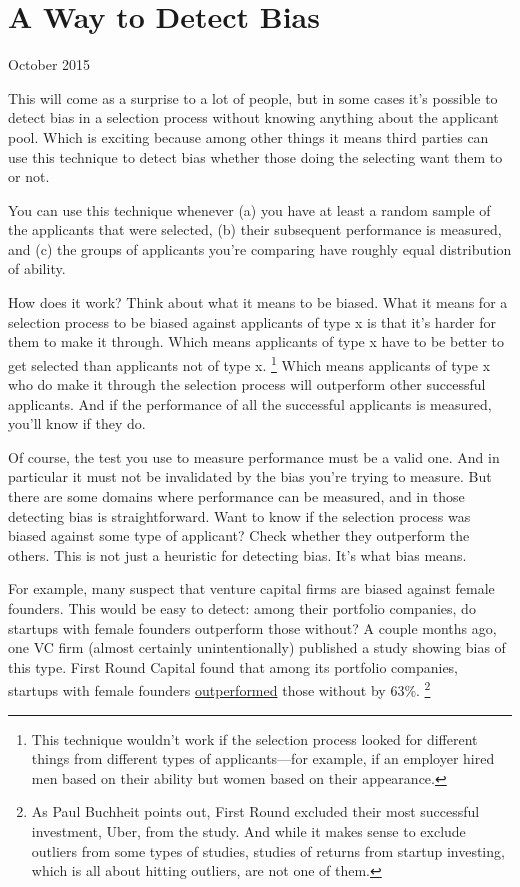 \chapter{A Way to Detect Bias}

October 2015

This will come as a surprise to a lot of people, but in some cases it's
possible to detect bias in a selection process without knowing anything
about the applicant pool. Which is exciting because among other things
it means third parties can use this technique to detect bias whether
those doing the selecting want them to or not.

You can use this technique whenever (a) you have at least a random
sample of the applicants that were selected, (b) their subsequent
performance is measured, and (c) the groups of applicants you're
comparing have roughly equal distribution of ability.

How does it work? Think about what it means to be biased. What it means
for a selection process to be biased against applicants of type x is
that it's harder for them to make it through. Which means applicants of
type x have to be better to get selected than applicants not of type x.
\footnote{This technique wouldn't work if the selection process looked for
different things from different types of applicants---for example, if an
employer hired men based on their ability but women based on their
appearance.} Which means applicants of type x who do make it
through the selection process will outperform other successful
applicants. And if the performance of all the successful applicants is
measured, you'll know if they do.

Of course, the test you use to measure performance must be a valid one.
And in particular it must not be invalidated by the bias you're trying
to measure. But there are some domains where performance can be
measured, and in those detecting bias is straightforward. Want to know
if the selection process was biased against some type of applicant?
Check whether they outperform the others. This is not just a heuristic
for detecting bias. It's what bias means.

For example, many suspect that venture capital firms are biased against
female founders. This would be easy to detect: among their portfolio
companies, do startups with female founders outperform those without? A
couple months ago, one VC firm (almost certainly unintentionally)
published a study showing bias of this type. First Round Capital found
that among its portfolio companies, startups with female founders
\href{http://10years.firstround.com/\#one}{outperformed} those without
by 63\%. \footnote{As Paul Buchheit points out, First Round excluded their most
successful investment, Uber, from the study. And while it makes sense to
exclude outliers from some types of studies, studies of returns from
startup investing, which is all about hitting outliers, are not one of
them.}

